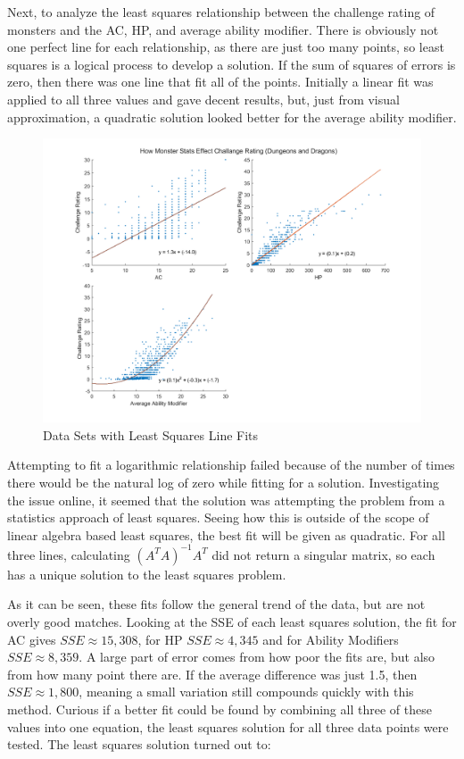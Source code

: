 \documentclass{article}
\begin{document}
\par Next, to analyze the least squares relationship between the challenge rating of monsters and the AC, HP, and average ability modifier. There is obviously not one perfect line for each relationship, as there are just too many points, so least squares is a logical process to develop a solution. If the sum of squares of errors is zero, then there was one line that fit all of the points. Initially a linear fit was applied to all three values and gave decent results, but, just from visual approximation, a quadratic solution looked better for the average ability modifier.
\begin{figure}
\begin{center}
    \includegraphics[width = \textwidth]{Graphs.png}
    \end{center}
    \caption{Data Sets with Least Squares Line Fits}
    \label{fig:my_label}
\end{figure}
Attempting to fit a logarithmic relationship failed because of the number of times there would be the natural log of zero while fitting for a solution. Investigating the issue online, it seemed that the solution was attempting the problem from a statistics approach of least squares. Seeing how this is outside of the scope of linear algebra based least squares, the best fit will be given as quadratic. For all three lines, calculating $(A^TA)^{-1}A^T$ did not return a singular matrix, so each has a unique solution to the least squares problem.
\par As it can be seen, these fits follow the general trend of the data, but are not overly good matches. Looking at the SSE of each least squares solution, the fit for AC gives $SSE\approx 15,308$, for HP $SSE\approx 4,345$ and for Ability Modifiers $SSE\approx 8,359$. A large part of error comes from how poor the fits are, but also from how many point there are. If the average difference was just 1.5, then $SSE \approx 1,800$, meaning a small variation still compounds quickly with this method. Curious if a better fit could be found by combining all three of these values into one equation, the least squares solution for all three data points were tested. The least squares solution turned out to:
\end{document}
